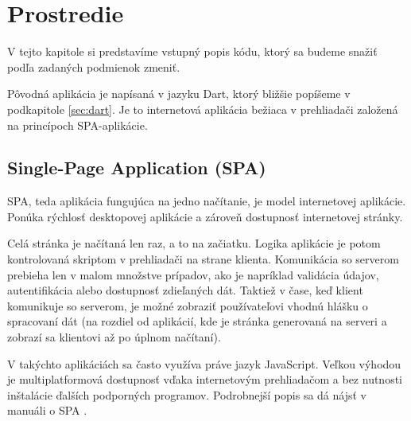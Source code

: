 \chapter{Prostredie}

\label{kap:prostredie} %

V tejto kapitole si predstavíme vstupný popis kódu, ktorý sa budeme snažiť podľa zadaných podmienok zmeniť.

Pôvodná aplikácia je napísaná v jazyku Dart, ktorý bližšie popíšeme v podkapitole \ref{sec:dart}. Je to internetová aplikácia bežiaca v prehliadači založená na princípoch SPA-aplikácie.

\section{Single-Page Application (SPA)}
SPA, teda aplikácia fungujúca na jedno načítanie, je model internetovej aplikácie. Ponúka rýchlosť desktopovej aplikácie a zároveň dostupnosť internetovej stránky.

Celá stránka je načítaná len raz, a to na začiatku. Logika aplikácie je potom kontrolovaná skriptom v prehliadači na strane klienta. 
Komunikácia so serverom prebieha len v malom množstve prípadov, ako je napríklad validácia údajov, autentifikácia alebo dostupnosť zdieľaných dát. 
Taktiež v čase, keď klient komunikuje so serverom, je možné zobraziť používateľovi vhodnú hlášku o spracovaní dát (na rozdiel od aplikácií, kde je stránka generovaná na serveri a zobrazí sa klientovi až po úplnom načítaní).

V takýchto aplikáciách sa často využíva práve jazyk JavaScript. Veľkou výhodou je multiplatformová dostupnosť vďaka internetovým prehliadačom a bez nutnosti inštalácie ďalších podporných programov. Podrobnejší popis sa dá nájsť v manuáli o SPA \cite{SPA}.


